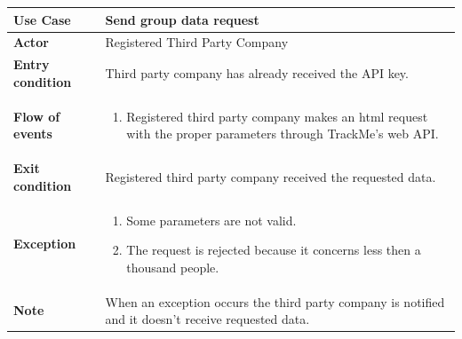 \documentclass[../main.tex]{subfiles}
\begin{document}
	\vspace*{3cm}
	\begin{center}
		\begin{tabular}{p{3cm}p{8.28cm}}
			\hline
			\textbf{Use Case} & Send group data request\\
			\hline
			\textbf{Actor} & Registered Third Party Company\\
			\hline
			\textbf{Entry condition} & Third party company has already received the API key.\\
			\hline
			\textbf{Flow of events} & \begin{enumerate}
				\linespread{0}\item Registered third party company makes an html request with the proper parameters through TrackMe's web API.
			\end{enumerate}\\
			\hline
			\textbf{Exit condition} & Registered third party company received the requested data.\\
			\hline
			\textbf{Exception} & \begin{enumerate}
				\linespread{0}\item Some parameters are not valid.
				\linespread{0}\item The request is rejected because it concerns less then a thousand people.
			\end{enumerate}\\
			\hline
			\textbf{Note} & When an exception occurs the third party company is notified and it doesn't receive requested data. \\
			\hline
		\end{tabular}
	\end{center}
	\vspace*{3cm}
\end{document}

